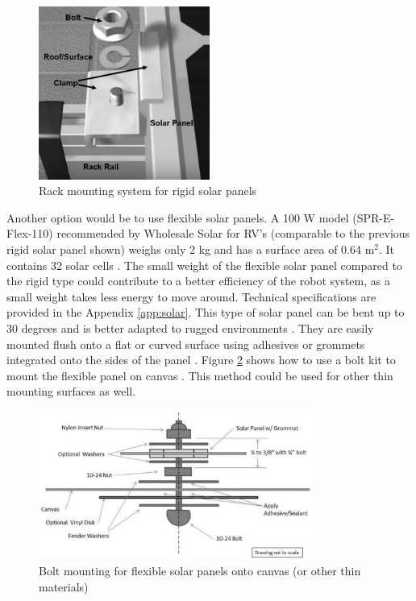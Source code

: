 \begin{figure}[H]
    \centering
    \includegraphics[width=0.5\textwidth]{Sections/LiteratureReview/img/solar/solar_rack1.JPG}
    \caption{Rack mounting system for rigid solar panels \cite{gogreensolar_ironridge_2015}}
    \label{fig:solar_rack1}
\end{figure}

Another option would be to use flexible solar panels. A 100 W model (SPR-E-Flex-110) recommended by Wholesale Solar for RV's (comparable to the previous rigid solar panel shown) weighs only 2 kg and has a surface area of 0.64 m$^{2}$. It contains 32 solar cells \cite{wholesale_solar_sunpower_nodate}. The small weight of the flexible solar panel compared to the rigid type could contribute to a better efficiency of the robot system, as a small weight takes less energy to move around. Technical specifications are provided in the Appendix \ref{app:solar}. This type of solar panel can be bent up to 30 degrees and is better adapted to rugged environments \cite{powerscout_should_2017}. They are easily mounted flush onto a flat or curved surface using adhesives or grommets integrated onto the sides of the panel \cite{wholesale_solar_sunpower_nodate}. Figure \ref{fig:solar_bolt} shows how to use a bolt kit to mount the flexible panel on canvas \cite{custom_marine_products_flexible_nodate}. This method could be used for other thin mounting surfaces as well.

\begin{figure}[H]
    \centering
    \includegraphics[width=0.8\textwidth]{Sections/LiteratureReview/img/solar/solar_bolt.JPG}
    \caption{Bolt mounting for flexible solar panels onto canvas (or other thin materials) \cite{custom_marine_products_flexible_nodate}}
    \label{fig:solar_bolt}
\end{figure}

